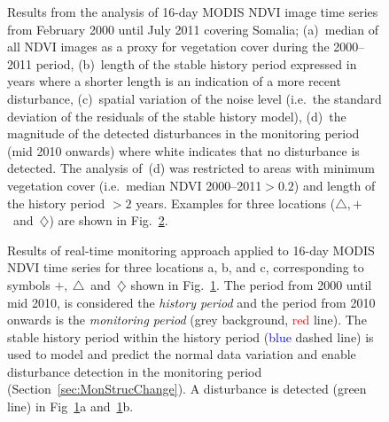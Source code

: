\documentclass[authoryear,preprint,review,10pt]{elsarticle}
\begin{document}
\begin{figure}[htp]
\centering
 \caption{Results from the analysis of 16-day MODIS NDVI image time series from February 2000 until July 2011 covering Somalia; (a)~median of all NDVI
 images as a proxy for vegetation cover during the 2000--2011 period, (b)~length of the stable history period expressed in years where a shorter length is an indication of a more recent disturbance, (c)~spatial variation of the noise level (i.e.\ the standard deviation of the residuals of the stable history model), (d)~the magnitude of the detected disturbances in the monitoring period (mid 2010 onwards) where white indicates that no disturbance is detected. The analysis of~(d) was restricted to areas with minimum vegetation cover (i.e.\ median NDVI  2000--2011$> 0.2$) and length of the history period $> 2$ years. Examples for three locations ($\triangle,+$~and~$\diamondsuit$) are shown in Fig.~\ref{fig:realmon}.}
 \label{fig:spatial}
\end{figure}

\begin{figure}[htp]
\centering
  \caption{
 Results of real-time monitoring approach applied to 16-day MODIS NDVI time series for three locations a, b, and c, corresponding to symbols
 $+,~\triangle$~and~$\diamondsuit$ shown in Fig.~\ref{fig:spatial}. The period from 2000 until mid 2010, is considered the \emph{history period} and the
 period from 2010 onwards is the \emph{monitoring period} (grey background, \textcolor{red} {red} line). The stable history period within the
 history period (\textcolor{blue} {blue} dashed line) is used to model and predict the normal data variation and enable disturbance detection in the
 monitoring period (Section~\ref{sec:MonStrucChange}).  A disturbance is detected (\textcolor{OliveGreen} {green} line) in Fig~\ref{fig:spatial}a and~\ref{fig:spatial}b.}
  \label{fig:realmon}
\end{figure}
 
\end{document}

